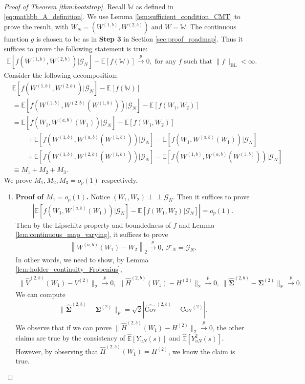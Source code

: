 \documentclass[12pt]{article}
\newcommand{\indep}{\perp \!\!\! \perp}
\newcommand{\E}{\mathbb E}								%
\newcommand{\convp}{\overset p \rightarrow}             %
\begin{document}
\begin{proof}[Proof of Theorem \ref{thm:bootstrap}]
	Recall $\mathbb{W}$ as defined in \eqref{eq:mathbb_A_definition}. We use Lemma \ref{lem:sufficient_condition_CMT} to prove the result, with $W_N=(W^{(1,b)},W^{(2,b)})$ and $W=\mathbb{W}$. The continuous function $g$ is chosen to be as in \textbf{Step 3} in Section \ref{sec:proof_roadmap}. Thus it suffices to prove the following statement is true:
	\begin{align*}
		\E[f(W^{(1,b)},W^{(2,b)})|\mathcal{G}_N]-\E[f(\mathbb{W})]\convp 0,\text{ for any }f\text{ such that } \|f\|_{\mathrm{BL}}<\infty.
	\end{align*}
	Consider the following decomposition: 
	\begin{align*}
		&
		\E[f(W^{(1,b)},W^{(2,b)})|\mathcal{G}_N]-\E[f(\mathbb{W})]\\
		&
		=\E[f(W^{(1,b)},W^{(2,b)}(W^{(1,b)}))|\mathcal{G}_N]-\E[f(W_1,W_2)]\\
		&
		=\E[f(W_1,W^{(a,b)}(W_1))|\mathcal{G}_N]-\E[f(W_1,W_2)]\\
		&
		\qquad+\E[f(W^{(1,b)},W^{(a,b)}(W^{(1,b)}))|\mathcal{G}_N]-\E[f(W_1,W^{(a,b)}(W_1))|\mathcal{G}_N]\\
		&
		\qquad + \E[f(W^{(1,b)},W^{(2,b)}(W^{(1,b)}))|\mathcal{G}_N]-\E[f(W^{(1,b)},W^{(a,b)}(W^{(1,b)}))|\mathcal{G}_N]\\
		&
		\equiv M_1+M_2+M_3.
	\end{align*}
	We prove $M_1,M_2,M_3=o_p(1)$ respectively. 
	\begin{enumerate}
		\item \textbf{Proof of $M_1=o_p(1)$.} Notice $(W_1,W_2)\indep \mathcal{G}_N$. Then it suffices to prove 
		\begin{align*}
			\left|\E[f(W_1,W^{(a,b)}(W_1))|\mathcal{G}_N]-\E[f(W_1,W_2)|\mathcal{G}_N]\right|=o_p(1).
		\end{align*}
		Then by the Lipschitz property and boundedness of $f$ and Lemma \ref{lem:continuous_map_varying}, it suffices to prove 
		\begin{align*}
			\left\|W^{(a,b)}(W_1)-W_2\right\|_2\convp 0,\ \mathcal{F}_N=\mathcal{G}_N.
		\end{align*}
		In other words, we need to show, by Lemma \ref{lem:holder_continuity_Frobenius},
		\begin{align*}
			\|\hat{V}^{(2,b)}(W_1)-V^{(2)}\|_2\convp 0,\ \|\hat{H}^{(2,b)}(W_1)-H^{(2)}\|_2\convp 0,\ \|\hat{\bm \Sigma}^{(2,b)}-\bm\Sigma^{(2)}\|_{\mathrm{F}}\convp 0.
		\end{align*}
		We can compute 
		\begin{align*}
			\|\hat{\bm \Sigma}^{(2,b)}-\bm\Sigma^{(2)}\|_{\mathrm{F}}=\sqrt{2}|\hat{\mathrm{Cov}}^{(2,b)}-\mathrm{Cov}^{(2)}|.
		\end{align*}
		We observe that if we can prove $\|\hat{H}^{(2,b)}(W_1)-H^{(2)}\|_2\convp 0$, the other claims are true by the consistency of $\hat{\mathbb{E}}[Y_{uN}(s)]$ and $\hat{\mathbb{E}}[Y_{uN}^2(s)]$. However, by observing that $\hat{H}^{(2,b)}(W_1)=H^{(2)}$, we know the claim is true.
		

\end{enumerate}
\end{proof}
\end{document}
